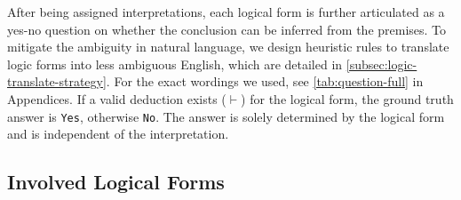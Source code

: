 After being assigned interpretations, each logical form is further articulated as a yes-no question on whether the conclusion can be inferred from the premises.
To mitigate the ambiguity in natural language, we design heuristic rules to translate logic forms into less ambiguous English, which are detailed in \cref{subsec:logic-translate-strategy}.
For the exact wordings we used, see \cref{tab:question-full} in Appendices.
If a valid deduction exists (\(\vdash\)) for the logical form,
the ground truth answer is \texttt{Yes}, otherwise \texttt{No}.
The answer is solely determined by the logical form and is independent of the interpretation.


\subsection{Involved Logical Forms}
\label{subsec:involved-logical-forms}

